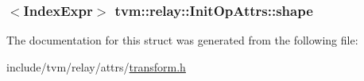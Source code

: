 \subsubsection[{\texorpdfstring{shape}{shape}}]{$<${\bf Index\+Expr}$>$ tvm\+::relay\+::\+Init\+Op\+Attrs\+::shape}\hypertarget{structtvm_1_1relay_1_1InitOpAttrs_aa7c73925a6df0388b1221c90fb3d7ba7}{}\label{structtvm_1_1relay_1_1InitOpAttrs_aa7c73925a6df0388b1221c90fb3d7ba7}


The documentation for this struct was generated from the following file\+:\begin{DoxyCompactItemize}
\item 
include/tvm/relay/attrs/\hyperlink{include_2tvm_2relay_2attrs_2transform_8h}{transform.\+h}\end{DoxyCompactItemize}
